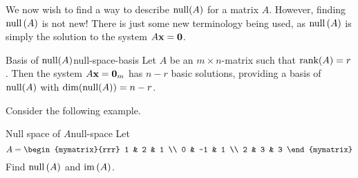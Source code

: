 We now wish to find a way to describe $\mbox{\rm null}(A)$ for a matrix
$A$. However, finding $\mbox{\rm null} \left(A\right)$ is not new! There is just
some new terminology being used, as $\mbox{\rm null} \left(A\right) $ is simply
the solution to the system $A\mbox{\bf x}=\mbox{\bf 0}$.

\begin{theorem}{Basis of $\mbox{\rm null}(A)$}{null-space-basis}
  Let $A$ be an $m \times n$-matrix such that $\mbox{\rm rank}(A) =
  r$. Then the system $A\mbox{\bf x}=\mbox{\bf 0}_m$ has $n-r$ basic
  solutions, providing a basis of $\mbox{\rm null}(A)$ with
  $\dim(\mbox{\rm null}(A))=n-r$.
\end{theorem}

Consider the following example.

\begin{example}{Null space of $A$}{null-space}
  Let
  \begin{equation*}
    A=\begin{mymatrix}{rrr}
      1 & 2 & 1 \\
      0 & -1 & 1 \\
      2 & 3 & 3
    \end{mymatrix}
  \end{equation*}
  Find $\mbox{\rm null} \left(A\right) $ and $\mbox{\rm im}\left(A\right)$.
\end{example}

